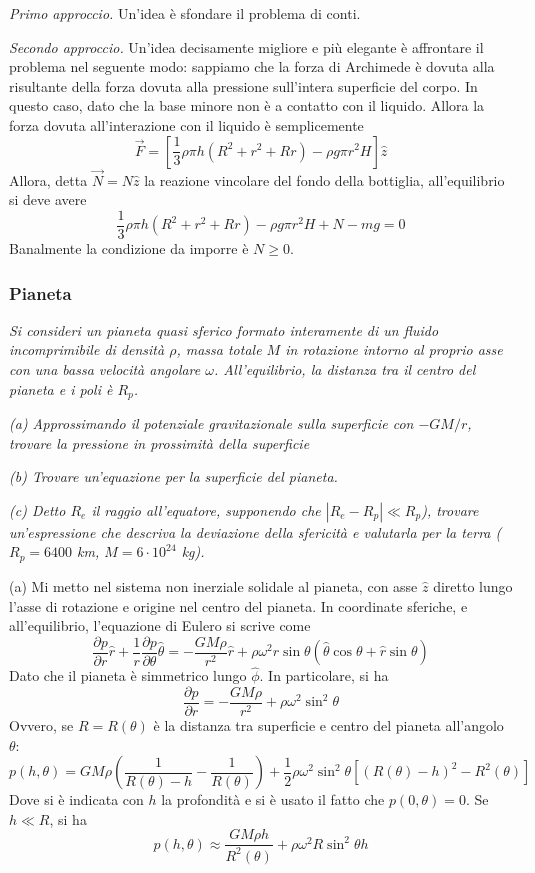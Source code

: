 \documentclass[a4paper,11pt]{article}
\begin{document}
\noindent \textit{Primo approccio.} Un'idea è sfondare il problema di conti.

\noindent\textit{Secondo approccio.} Un'idea decisamente migliore e più elegante è affrontare il problema nel seguente modo: sappiamo che la forza di Archimede è dovuta alla risultante della forza dovuta alla pressione sull'intera superficie del corpo. In questo caso, dato che la base minore non è a contatto con il liquido. Allora la forza dovuta all'interazione con il liquido è semplicemente
\[\vec{F}=\left[\frac{1}{3}\rho\pi h\left(R^2+r^2+Rr\right)-\rho g\pi r^2H\right]\hat{z}\]
Allora, detta $\vec{N}=N\hat{z}$ la reazione vincolare del fondo della bottiglia, all'equilibrio si deve avere
\[\frac{1}{3}\rho\pi h\left(R^2+r^2+Rr\right)-\rho g\pi r^2H+N-mg=0\]
Banalmente la condizione da imporre è $N\geq 0$.
\subsubsection{Pianeta}
\textit{Si consideri un pianeta quasi sferico formato interamente di un fluido incomprimibile di densità $\rho$, massa totale $M$ in rotazione intorno al proprio asse con una bassa velocità angolare $\omega$. All'equilibrio, la distanza tra il centro del pianeta e i poli è $R_p$.}

\noindent\textit{(a) Approssimando il potenziale gravitazionale sulla superficie con $-GM/r$, trovare la pressione in prossimità della superficie}

\noindent\textit{(b) Trovare un'equazione per la superficie del pianeta.}

\noindent\textit{(c) Detto $R_e$ il raggio all'equatore, supponendo che $|R_e-R_p|\ll R_p$), trovare un'espressione che descriva la deviazione della sfericità e valutarla per la terra ($R_p=6400$ km, $M=6\cdot10^{24}$ kg).}
\vspace{5mm}

\noindent (a) Mi metto nel sistema non inerziale solidale al pianeta, con asse $\hat{z}$ diretto lungo l'asse di rotazione e origine nel centro del pianeta. In coordinate sferiche, e all'equilibrio, l'equazione di Eulero si scrive come
\[\frac{\partial p}{\partial r}\hat{r}+\frac{1}{r}\frac{\partial p}{\partial \theta}\hat{\theta}=-\frac{GM\rho}{r^2}\hat{r}+\rho\omega^2r\sin\theta\left(\hat{\theta}\cos\theta+\hat{r}\sin\theta\right)\]
Dato che il pianeta è simmetrico lungo $\hat{\phi}$. In particolare, si ha
\[\frac{\partial p}{\partial r}=-\frac{GM\rho}{r^2}+\rho\omega^2\sin^2\theta\]
Ovvero, se $R=R(\theta)$ è la distanza tra superficie e centro del pianeta all'angolo $\theta$:
\[p(h,\theta)=GM\rho\left(\frac{1}{R(\theta)-h}-\frac{1}{R(\theta)}\right)+\frac{1}{2}\rho\omega^2\sin^2\theta\left[\left(R(\theta)-h\right)^2-R^2(\theta)\right]\]
Dove si è indicata con $h$ la profondità e si è usato il fatto che $p(0,\theta)=0$. Se $h\ll R$, si ha
\[p(h,\theta)\approx\frac{GM\rho h}{R^2(\theta)}+\rho\omega^2R\sin^2\theta h\]
\end{document}
